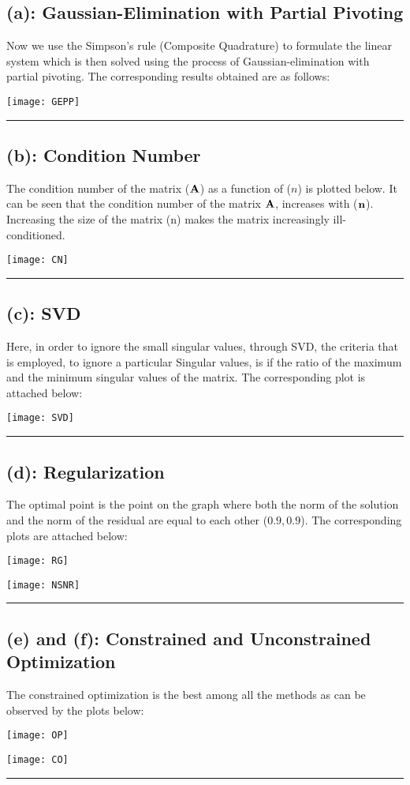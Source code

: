 \subsection*{(a): Gaussian-Elimination with Partial Pivoting}
Now we use the Simpson's rule (Composite Quadrature) to formulate the linear system which is then solved using the process of Gaussian-elimination with partial pivoting. The corresponding results obtained are as follows: 
\begin{center}
\texttt{[image: GEPP]}
\end{center}\hrule
\newpage\subsection*{(b): Condition Number}
The condition number of the matrix ($\bf A$) as a function of ($n$) is plotted below. It can be seen that the condition number of the matrix $\bf A$, increases with ($\bf n$). Increasing the size of the matrix (n) makes the matrix increasingly ill-conditioned. 
\begin{center}
\texttt{[image: CN]}
\end{center}\hrule
\newpage\subsection*{(c): SVD} 
Here, in order to ignore the small singular values, through SVD, the criteria that is employed, to ignore a particular Singular values, is if the ratio of the maximum and the minimum singular values of the matrix. The corresponding plot is attached below: 
\begin{center}
\texttt{[image: SVD]}
\end{center}\hrule
\newpage\subsection*{(d): Regularization}
The optimal point is the point on the graph where both the norm of the solution and the norm of the residual are equal to each other ($0.9,0.9$). The corresponding plots are attached below: 
\begin{center}
\texttt{[image: RG]}
\end{center}
\begin{center}
\texttt{[image: NSNR]}
\end{center}\hrule
\subsection*{(e) and (f): Constrained and Unconstrained Optimization}
The constrained optimization is the best among all the methods as can be observed by the plots below: 
\begin{center}
\texttt{[image: OP]}
\end{center}
\begin{center}
\texttt{[image: CO]}
\end{center}\hrule
